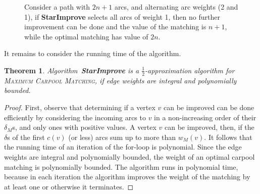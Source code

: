 \documentclass[11pt]{article}
\newtheorem{theorem}{Theorem}
\newcommand{\half}{\frac{1}{2}}
\newcommand{\carpool}{\textsc{Maximum Carpool Matching}\xspace}
\begin{document}
\begin{figure}[t]
\centering
{}
\caption[]{%
Consider a path with $2n + 1$ arcs, and alternating arc weights (2 and
1), if \textbf{StarImprove} selects all arcs of weight 1, then no
further improvement can be done and the value of the matching is $n +
1$, while the optimal matching has value of $2n$.}
\label{fig:grd worst}
\end{figure}

It remains to consider the running time of the algorithm.

\begin{theorem}
\label{thm:improve-bounded}
Algorithm~\textbf{StarImprove} is a $\half$-approximation algorithm
for \carpool, if edge weights are integral and polynomially bounded.
\end{theorem}
\begin{proof}
First, observe that determining if a vertex $v$ can be improved can be
done efficiently by considering the incoming arcs to $v$ in a
non-increasing order of their $\delta_M$s, and only ones with positive
values.  A vertex $v$ can be improved, then, if the $\delta$s of the
first $c(v)$ (or less) arcs sum up to more than $w_M(v)$.
%
It follows that the running time of an iteration of the for-loop is
polynomial.  Since the edge weights are integral and polynomially
bounded, the weight of an optimal carpool matching is polynomially
bounded.  The algorithm runs in polynomial time, because in each
iteration the algorithm improves the weight of the matching by at
least one or otherwise it terminates.
\end{proof}
\end{document}
